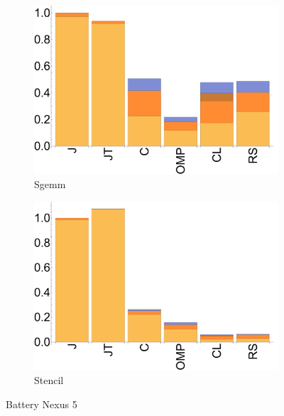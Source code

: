 \begin{figure}[ht]
  \begin{subfigure}[b]{0.3\textwidth}
      \includegraphics[width=\textwidth]{data/bbattery_sgemm_nexus5.pdf}
      \caption{Sgemm}\label{fig:b_Sgemm}
  \end{subfigure}

  \begin{subfigure}[b]{0.3\textwidth}
      \includegraphics[width=\textwidth]{data/bbattery_stencil_nexus5.pdf}
      \caption{Stencil} \label{fig:b_Stencil}
  \end{subfigure}

  \caption{Battery Nexus 5}
\end{figure}


